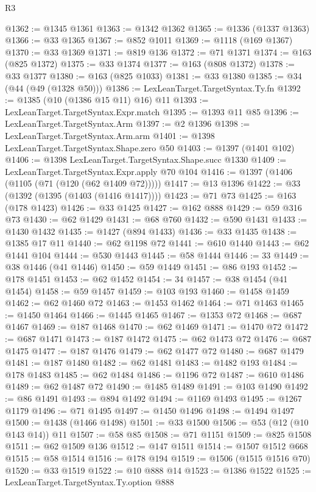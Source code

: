 \begin{lexlean}{R3}
\begin{coremodule}
@1362 := @1345 @1361
@1363 := @1342 @1362
@1365 := @1336 (@1337 @1363)
@1366 := @33 @1365
@1367 := @852 @1011
@1369 := @1118 (@169 @1367)
@1370 := @33 @1369
@1371 := @819 @136
@1372 := @71 @1371
@1374 := @163 (@825 @1372)
@1375 := @33 @1374
@1377 := @163 (@808 @1372)
@1378 := @33 @1377
@1380 := @163 (@825 @1033)
@1381 := @33 @1380
@1385 := @34 (@44 (@49 (@1328 @50)))
@1386 := LexLeanTarget.TargetSyntax.Ty.fn
@1392 := @1385 (@10 (@1386 @15 @11) @16) @11
@1393 := LexLeanTarget.TargetSyntax.Expr.match
@1395 := @1393 @11 @85
@1396 := LexLeanTarget.TargetSyntax.Arm
@1397 := @2 @1396
@1398 := LexLeanTarget.TargetSyntax.Arm.arm
@1401 := @1398 LexLeanTarget.TargetSyntax.Shape.zero @50
@1403 := @1397 (@1401 @102)
@1406 := @1398 LexLeanTarget.TargetSyntax.Shape.succ @1330
@1409 := LexLeanTarget.TargetSyntax.Expr.apply @70 @104
@1416 := @1397 (@1406 (@1105 (@71 (@120 (@62 @1409 @72)))))
@1417 := @13 @1396
@1422 := @33 (@1392 (@1395 (@1403 (@1416 @1417))))
@1423 := @71 @73
@1425 := @163 (@178 @1423)
@1426 := @33 @1425
@1427 := @162 @888
@1429 := @59 @316 @73
@1430 := @62 @1429
@1431 := @68 @760
@1432 := @590 @1431
@1433 := @1430 @1432
@1435 := @1427 (@894 @1433)
@1436 := @33 @1435
@1438 := @1385 @17 @11
@1440 := @62 @1198 @72
@1441 := @610 @1440
@1443 := @62 @1441 @104
@1444 := @530 @1443
@1445 := @58 @1444
@1446 := 33
@1449 := @38 @1446 (@41 @1446)
@1450 := @59 @1449
@1451 := @86 @193
@1452 := @178 @1451
@1453 := @62 @1452
@1454 := 34
@1457 := @38 @1454 (@41 @1454)
@1458 := @59 @1457
@1459 := @103 @193
@1460 := @1458 @1459
@1462 := @62 @1460 @72
@1463 := @1453 @1462
@1464 := @71 @1463
@1465 := @1450 @1464
@1466 := @1445 @1465
@1467 := @1353 @72
@1468 := @687 @1467
@1469 := @187 @1468
@1470 := @62 @1469
@1471 := @1470 @72
@1472 := @687 @1471
@1473 := @187 @1472
@1475 := @62 @1473 @72
@1476 := @687 @1475
@1477 := @187 @1476
@1479 := @62 @1477 @72
@1480 := @687 @1479
@1481 := @187 @1480
@1482 := @62 @1481
@1483 := @1482 @193
@1484 := @178 @1483
@1485 := @62 @1484
@1486 := @1196 @72
@1487 := @610 @1486
@1489 := @62 @1487 @72
@1490 := @1485 @1489
@1491 := @103 @1490
@1492 := @86 @1491
@1493 := @894 @1492
@1494 := @1169 @1493
@1495 := @1267 @1179
@1496 := @71 @1495
@1497 := @1450 @1496
@1498 := @1494 @1497
@1500 := @1438 (@1466 @1498)
@1501 := @33 @1500
@1506 := @53 (@12 (@10 @143 @14)) @11
@1507 := @58 @85
@1508 := @71 @1151
@1509 := @825 @1508
@1511 := @62 @1509 @136
@1512 := @147 @1511
@1514 := @1507 @1512 @668
@1515 := @58 @1514
@1516 := @178 @194
@1519 := @1506 (@1515 @1516 @70)
@1520 := @33 @1519
@1522 := @10 @888 @14
@1523 := @1386 @1522
@1525 := LexLeanTarget.TargetSyntax.Ty.option @888

\end{coremodule}
\end{lexlean}
